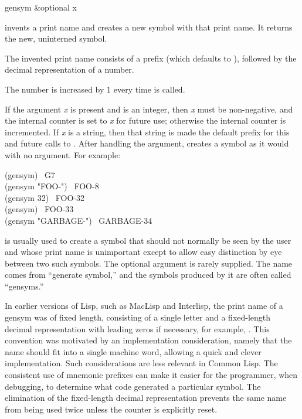 \begin{defun}[Function]
gensym &optional x

 invents a print name and creates a new symbol with that print name.
It returns the new, uninterned symbol.

The invented print name consists of a prefix
(which defaults to ), followed by the decimal representation of a number.
\begin{obsolete}
The number is increased by 1 every time  is called.

If the argument \emph{x} is present and is an integer, then \emph{x} must be
non-negative, and the internal counter is set to \emph{x} for future use;
otherwise the internal counter is incremented.
If \emph{x} is a string, then that string is made the default prefix
for this and future calls to .
After handling the argument,  creates a
symbol as it would with no argument.
For example:
\begin{lisp}
(gensym) \EV\ G7 \\
(gensym "FOO-") \EV\ FOO-8 \\
(gensym 32) \EV\ FOO-32 \\
(gensym) \EV\ FOO-33 \\
(gensym "GARBAGE-") \EV\ GARBAGE-34
\end{lisp}
\end{obsolete}

 is usually used to create a symbol that should not normally
be seen by the user and whose print name is unimportant except to
allow easy distinction by eye between two such symbols.
The optional argument is rarely supplied.
The name comes from ``generate symbol,'' and the symbols produced by it
are often called ``gensyms.''

\beforenoterule
\begin{incompatibility}
In earlier versions of Lisp, such as MacLisp and
Interlisp, the print name of a gensym was of fixed length, consisting
of a single letter and a fixed-length
decimal representation with leading zeros
if necessary, for example, .  This convention was
motivated by an implementation consideration, namely that the name
should fit into a single machine word, allowing a quick and clever
implementation.  Such considerations are less relevant in Common Lisp.
The consistent use of mnemonic prefixes can make it easier
for the programmer, when debugging, to determine what code generated
a particular symbol.  The elimination of the fixed-length decimal
representation prevents the same name from being used twice
unless the counter is explicitly reset.
\end{incompatibility}
\afternoterule


\end{defun}
